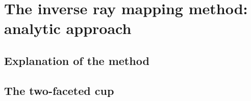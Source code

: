 
\chapter{The inverse ray mapping method: analytic approach}\label{chap:raymapping1}
\section{Explanation of the method}
\section{The two-faceted cup}

